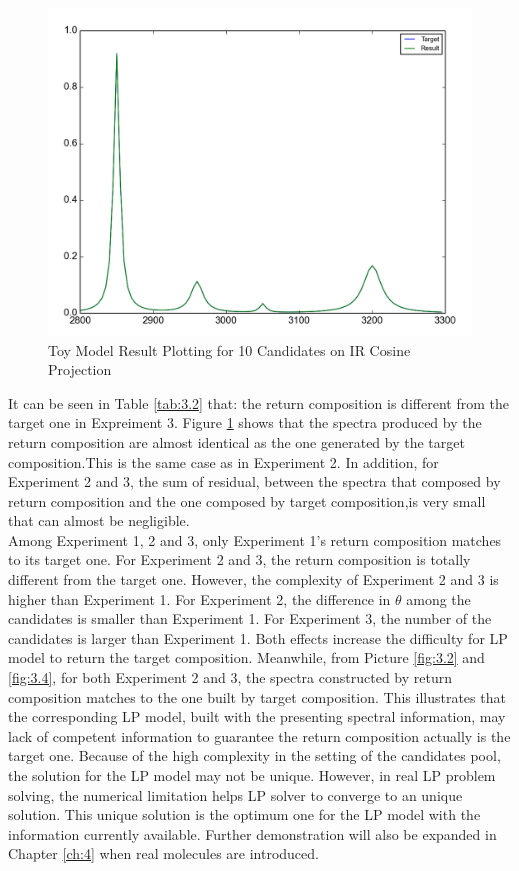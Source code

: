 \begin{figure}[!ht] \label{fig:3.3}
\centering
\includegraphics[scale=0.3]{Figures/toy_model_result_plotting_ir_cos_10candi_1.png} 
\caption{Toy Model Result Plotting for 10 Candidates on IR Cosine Projection}
\end{figure}

It can be seen in Table \ref{tab:3.2} that: the return composition is different from the target one in Expreiment 3. Figure \ref{fig:3.3} shows that the spectra produced by the return composition are almost identical as the one generated by the target composition.This is the same case as in Experiment 2. In addition, for Experiment 2 and 3, the sum of residual, between the spectra that composed by return composition and the one composed by target composition,is very small that can almost be negligible. \\

Among Experiment 1, 2 and 3, only Experiment 1's return composition matches to its target one. For Experiment 2 and 3, the return composition is totally different from the target one. However, the complexity of Experiment 2 and 3 is higher than Experiment 1. For Experiment 2, the difference in $\theta$ among the candidates is smaller than Experiment 1. For Experiment 3, the number of the candidates is larger than Experiment 1. Both effects increase the difficulty for LP model to return the target composition. Meanwhile, from Picture \ref{fig:3.2} and \ref{fig:3.4}, for both Experiment 2 and 3, the spectra constructed by return composition matches to the one built by target composition. This illustrates that the corresponding LP model, built with the presenting spectral information, may lack of competent information to guarantee the return composition actually  is the target one. Because of the high complexity in the setting of the candidates pool, the solution for the LP model may not be unique. However, in real LP problem solving, the numerical limitation helps LP solver to converge to an unique solution. This unique solution is the optimum one for the LP model with the information currently available. Further demonstration will also be expanded in Chapter \ref{ch:4} when real molecules are introduced. \\

